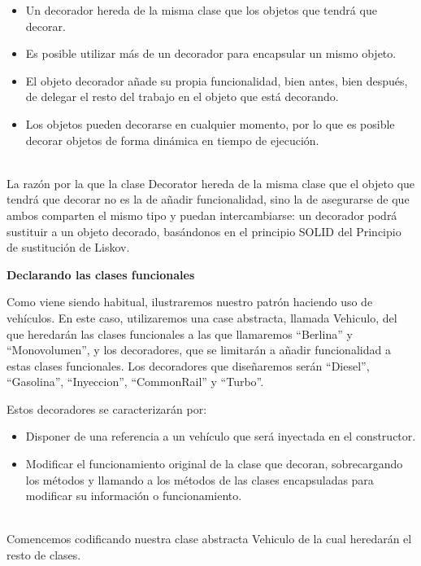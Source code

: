 \begin{flushleft}
\begin{itemize}



  \item Un decorador hereda de la misma clase que los objetos que tendrá que decorar.
  \item Es posible utilizar más de un decorador para encapsular un mismo objeto.
\item El objeto decorador añade su propia funcionalidad, bien antes, bien después, de delegar el resto del trabajo en el objeto que está decorando.
\item Los objetos pueden decorarse en cualquier momento, por lo que es posible decorar objetos de forma dinámica en tiempo de ejecución.

\end{itemize} 

\textbf{}\\
La razón por la que la clase Decorator hereda de la misma clase que el objeto que tendrá que decorar no es la de añadir funcionalidad, sino la de asegurarse de que ambos comparten el mismo tipo y puedan intercambiarse: un decorador podrá sustituir a un objeto decorado, basándonos en el principio SOLID del Principio de sustitución de Liskov.


\textbf{Declarando las clases funcionales}

Como viene siendo habitual, ilustraremos nuestro patrón haciendo uso de vehículos. En este caso, utilizaremos una case abstracta, llamada Vehiculo, del que heredarán las clases funcionales a las que llamaremos “Berlina” y “Monovolumen”, y los decoradores, que se limitarán a añadir funcionalidad a estas clases funcionales. Los decoradores que diseñaremos serán “Diesel”, “Gasolina”, “Inyeccion”, “CommonRail” y “Turbo”.

Estos decoradores se caracterizarán por:

\begin{itemize}



  \item Disponer de una referencia a un vehículo que será inyectada en el constructor.
  \item Modificar el funcionamiento original de la clase que decoran, sobrecargando los métodos y llamando a los métodos de las clases encapsuladas para modificar su información o funcionamiento.


\end{itemize} 

\textbf{}\\ 
Comencemos codificando nuestra clase abstracta Vehiculo de la cual heredarán el resto de clases.


\end{flushleft}
